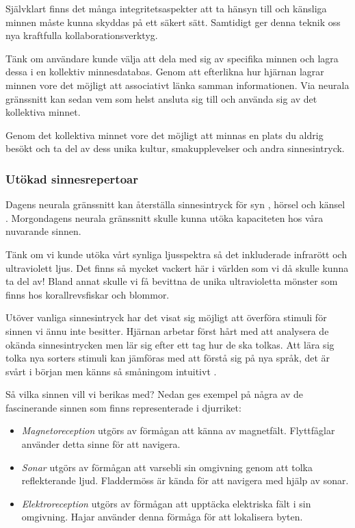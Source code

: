 \documentclass[12pt, a4paper]{article}
\begin{document}
Självklart finns det många integritetsaspekter att ta hänsyn till och känsliga minnen måste kunna skyddas på ett säkert sätt. Samtidigt ger denna teknik oss nya kraftfulla kollaborationsverktyg.

Tänk om användare kunde välja att dela med sig av specifika minnen och lagra dessa i en kollektiv minnesdatabas. Genom att efterlikna hur hjärnan lagrar minnen vore det möjligt att associativt länka samman informationen. Via neurala gränssnitt kan sedan vem som helst ansluta sig till och använda sig av det kollektiva minnet.

Genom det kollektiva minnet vore det möjligt att minnas en plats du aldrig besökt och ta del av dess unika kultur, smakupplevelser och andra sinnesintryck.



\subsubsection{Utökad sinnesrepertoar}

Dagens neurala gränssnitt kan återställa sinnesintryck för syn \cite{sight1}, hörsel \cite{sound} och känsel \cite{touch}. Morgondagens neurala gränssnitt skulle kunna utöka kapaciteten hos våra nuvarande sinnen.

Tänk om vi kunde utöka vårt synliga ljusspektra så det inkluderade infrarött och ultraviolett ljus. Det finns så mycket vackert här i världen som vi då skulle kunna ta del av! Bland annat skulle vi få bevittna de unika ultravioletta mönster som finns hos korallrevsfiskar \cite{uv_patterns} och blommor.

Utöver vanliga sinnesintryck har det visat sig möjligt att överföra stimuli för sinnen vi ännu inte besitter. Hjärnan arbetar först hårt med att analysera de okända sinnesintrycken men lär sig efter ett tag hur de ska tolkas. Att lära sig tolka nya sorters stimuli kan jämföras med att förstå sig på nya språk, det är svårt i början men känns så småningom intuitivt \cite{learn_sense}.

Så vilka sinnen vill vi berikas med? Nedan ges exempel på några av de fascinerande sinnen som finns representerade i djurriket:

\begin{itemize}
	\item \textit{Magnetoreception} utgörs av förmågan att känna av magnetfält. Flyttfåglar använder detta sinne för att navigera.
	\item \textit{Sonar} utgörs av förmågan att varsebli sin omgivning genom att tolka reflekterande ljud. Fladdermöss är kända för att navigera med hjälp av sonar.
	\item \textit{Elektroreception} utgörs av förmågan att upptäcka elektriska fält i sin omgivning. Hajar använder denna förmåga för att lokalisera byten.
\end{itemize}
\end{document}
